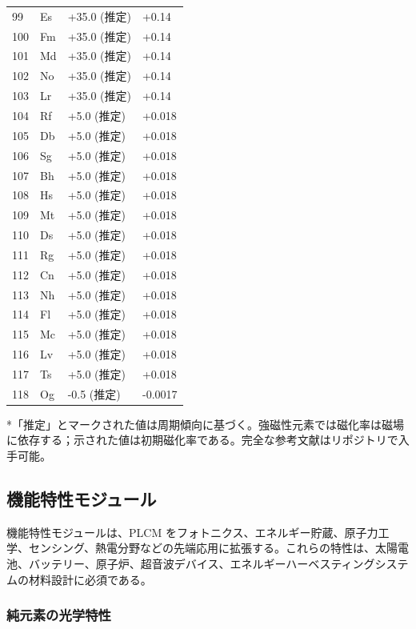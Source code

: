 \documentclass[11pt,a4paper]{article}
\theoremstyle{remark}
\begin{document}
\begin{longtable}{p{0.6cm}p{1.2cm}p{2.5cm}p{2.5cm}}
		99 & Es & +35.0 (推定) & +0.14 \\
		100& Fm & +35.0 (推定) & +0.14 \\
		101& Md & +35.0 (推定) & +0.14 \\
		102& No & +35.0 (推定) & +0.14 \\
		103& Lr & +35.0 (推定) & +0.14 \\
		104& Rf & +5.0 (推定) & +0.018 \\
		105& Db & +5.0 (推定) & +0.018 \\
		106& Sg & +5.0 (推定) & +0.018 \\
		107& Bh & +5.0 (推定) & +0.018 \\
		108& Hs & +5.0 (推定) & +0.018 \\
		109& Mt & +5.0 (推定) & +0.018 \\
		110& Ds & +5.0 (推定) & +0.018 \\
		111& Rg & +5.0 (推定) & +0.018 \\
		112& Cn & +5.0 (推定) & +0.018 \\
		113& Nh & +5.0 (推定) & +0.018 \\
		114& Fl & +5.0 (推定) & +0.018 \\
		115& Mc & +5.0 (推定) & +0.018 \\
		116& Lv & +5.0 (推定) & +0.018 \\
		117& Ts & +5.0 (推定) & +0.018 \\
		118& Og & -0.5 (推定) & -0.0017 \\
		\bottomrule
	\end{longtable}
	*「推定」とマークされた値は周期傾向に基づく。強磁性元素では磁化率は磁場に依存する；示された値は初期磁化率である。完全な参考文献はリポジトリで入手可能。
	
	
	\subsection{機能特性モジュール}
	\label{subsec:functional-properties}
	
	機能特性モジュールは、PLCM をフォトニクス、エネルギー貯蔵、原子力工学、センシング、熱電分野などの先端応用に拡張する。これらの特性は、太陽電池、バッテリー、原子炉、超音波デバイス、エネルギーハーベスティングシステムの材料設計に必須である。
	
	\subsubsection{純元素の光学特性}
	\label{subsec:optical-properties}
	
\end{document}
